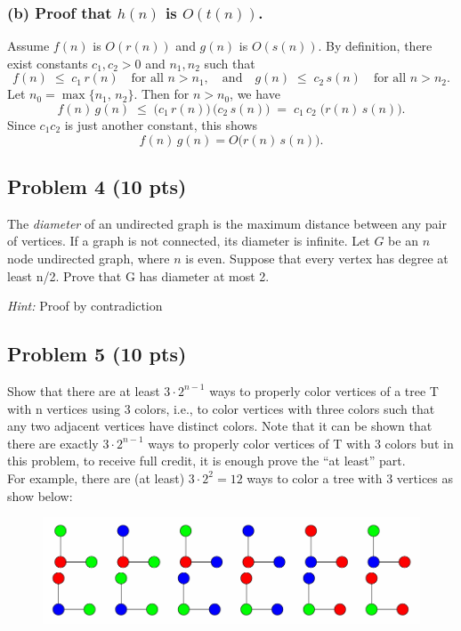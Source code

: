 \documentclass[12pt]{article}
\begin{document}
\subsubsection*{(b) Proof that $h(n)$ is $O(t(n))$.}

Assume $f(n)$ is $O(r(n))$ and $g(n)$ is $O(s(n))$. By definition, there exist constants $c_1, c_2 > 0$ and $n_1, n_2$ such that
\[
f(n) \;\le\; c_1\,r(n) \quad \text{for all } n > n_1,
\quad\text{and}\quad
g(n) \;\le\; c_2\,s(n) \quad \text{for all } n > n_2.
\]
Let $n_0 = \max\{n_1,\,n_2\}$. Then for $n > n_0$, we have
\[
f(n)\,g(n)
\;\le\;
\bigl(c_1\,r(n)\bigr)\,\bigl(c_2\,s(n)\bigr)
\;=\;
c_1\,c_2\;\bigl(r(n)\,s(n)\bigr).
\]
Since $c_1 c_2$ is just another constant, this shows
\[
f(n)\,g(n) = O\bigl(r(n)\,s(n)\bigr).
\]

\subsection*{Problem 4 (10 pts)}
The \textit{diameter} of an undirected graph is the maximum distance between any pair of vertices. If a graph is not connected, its diameter is infinite. Let $G$ be an $n$ node undirected graph, where $n$ is even. Suppose that every vertex has degree at least n/2. Prove that G has diameter at most 2.

\textit{Hint:} Proof by contradiction

\subsection*{Problem 5 (10 pts)}
Show that there are at least $3\cdot2^{n-1}$ ways to properly color vertices of a tree T with n vertices using 3 colors, i.e., to color vertices with three colors such that any two adjacent vertices have  distinct colors. Note that it can be shown that there are exactly $3\cdot2^{n-1}$ ways to properly color vertices of T with 3 colors but in this problem, to receive full credit, it is enough prove the “at least” part.\\
For example, there are (at least) $3\cdot2^2 = 12$ ways to color a tree with 3 vertices as show below:

\begin{figure}[H]
    \centering
    \includegraphics[width=0.8\linewidth]{P5.png}
    \label{fig:3-color-graph}
\end{figure}
\end{document}

